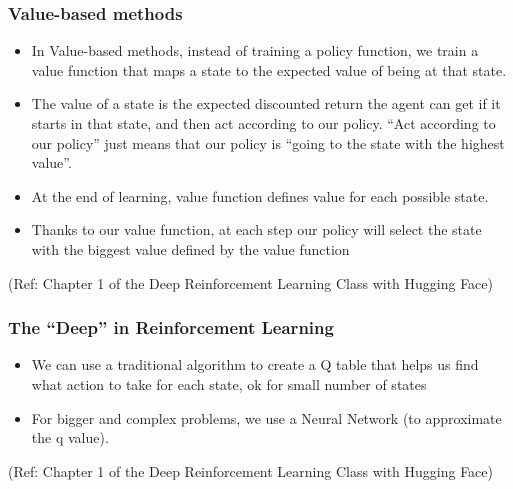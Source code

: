 \begin{frame}[fragile]\frametitle{Value-based methods}

\begin{itemize}
\item In Value-based methods, instead of training a policy function, we train a value function that maps a state to the expected value of being at that state.
\item The value of a state is the expected discounted return the agent can get if it starts in that state, and then act according to our policy. ``Act according to our policy'' just means that our policy is “going to the state with the highest value”.
\item At the end of learning, value function defines value for each possible state.
\item Thanks to our value function, at each step our policy will select the state with the biggest value defined by the value function
\end{itemize}


{\tiny (Ref: Chapter 1 of the Deep Reinforcement Learning Class with Hugging Face)}


\end{frame}


\begin{frame}[fragile]\frametitle{The ``Deep'' in Reinforcement Learning}

\begin{itemize}
\item We can use a traditional algorithm to create a Q table that helps us find what action to take for each state, ok for small number of states
\item For bigger and complex problems, we use a Neural Network (to approximate the q value).
\end{itemize}


{\tiny (Ref: Chapter 1 of the Deep Reinforcement Learning Class with Hugging Face)}


\end{frame}

